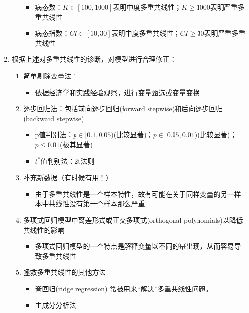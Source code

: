 \documentclass[12pt,(landscape,a4paper),(portrait,a4paper)]{article}
\providecommand{\tightlist}{%
  \setlength{\itemsep}{0pt}\setlength{\parskip}{0pt}}
\begin{document}
\begin{enumerate}
\begin{enumerate}
    \begin{itemize}
    \tightlist
    \item
      病态数：\(K \in[100,1000]\)表明中度多重共线性；\(K \geq{1000}\)表明严重多重共线性
    \item
      病态指数：\(CI \in[10,30]\)表明中度多重共线性；\(CI \geq{30}\)表明严重多重共线性
    \end{itemize}
  \end{enumerate}
\item
  根据上述对多重共线性的诊断，对模型进行合理修正：

  \begin{enumerate}
  \def\labelenumii{\alph{enumii}.}
  \tightlist
  \item
    简单剔除变量法：

    \begin{itemize}
    \tightlist
    \item
      依据经济学和实践经验观察，进行变量甄选或变量变换
    \end{itemize}
  \item
    逐步回归法：包括前向逐步回归(forward
    stepwise)和后向逐步回归(backward stepwise)

    \begin{itemize}
    \tightlist
    \item
      p值判别法：\(p\in[0.1,0.05)\)(比较显著)；\(p\in[0.05,0.01)\)(比较显著)；\(p\leq 0.01\)(极其显著)
    \item
      \(t^{\ast}\)值判别法：2t法则
    \end{itemize}
  \item
    补充新数据（有时候有用！）

    \begin{itemize}
    \tightlist
    \item
      由于多重共线性是一个样本特性，故有可能在关于同样变量的另一样本中共线性没有第一个样本那么严重
    \end{itemize}
  \item
    多项式回归模型中离差形式或正交多项式(orthogonal
    polynomials)以降低共线性的影响

    \begin{itemize}
    \tightlist
    \item
      多项式回归模型的一个特点是解释变量以不同的幂出现，从而容易导致多重共线性
    \end{itemize}
  \item
    拯救多重共线性的其他方法

    \begin{itemize}
    \tightlist
    \item
      脊回归(ridge regression) 常被用来``解决''多重共线性问题。
    \item
      主成分分析法


\end{itemize}
\end{enumerate}
\end{enumerate}
\end{document}
